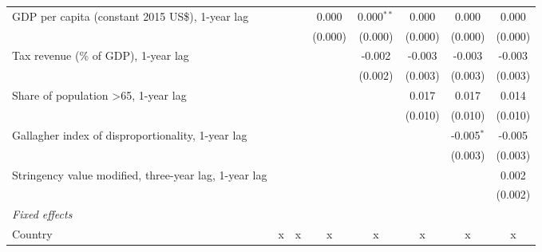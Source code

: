 \begin{tabular}{lccccccc}
   GDP per capita (constant 2015 US\$), 1-year lag                                   &              &              & 0.000         & 0.000$^{**}$  & 0.000          & 0.000          & 0.000\\   
                                                                                     &              &              & (0.000)       & (0.000)       & (0.000)        & (0.000)        & (0.000)\\   
   Tax revenue (\% of GDP), 1-year lag                                               &              &              &               & -0.002        & -0.003         & -0.003         & -0.003\\   
                                                                                     &              &              &               & (0.002)       & (0.003)        & (0.003)        & (0.003)\\   
   Share of population >65, 1-year lag                                               &              &              &               &               & 0.017          & 0.017          & 0.014\\   
                                                                                     &              &              &               &               & (0.010)        & (0.010)        & (0.010)\\   
   Gallagher index of disproportionality, 1-year lag                                 &              &              &               &               &                & -0.005$^{*}$   & -0.005\\   
                                                                                     &              &              &               &               &                & (0.003)        & (0.003)\\   
   Stringency value modified, three-year lag, 1-year lag                             &              &              &               &               &                &                & 0.002\\   
                                                                                     &              &              &               &               &                &                & (0.002)\\   
   \emph{Fixed effects}\\
   Country                                                                           & x            & x            & x             & x             & x              & x              & x\\  

\end{tabular}
